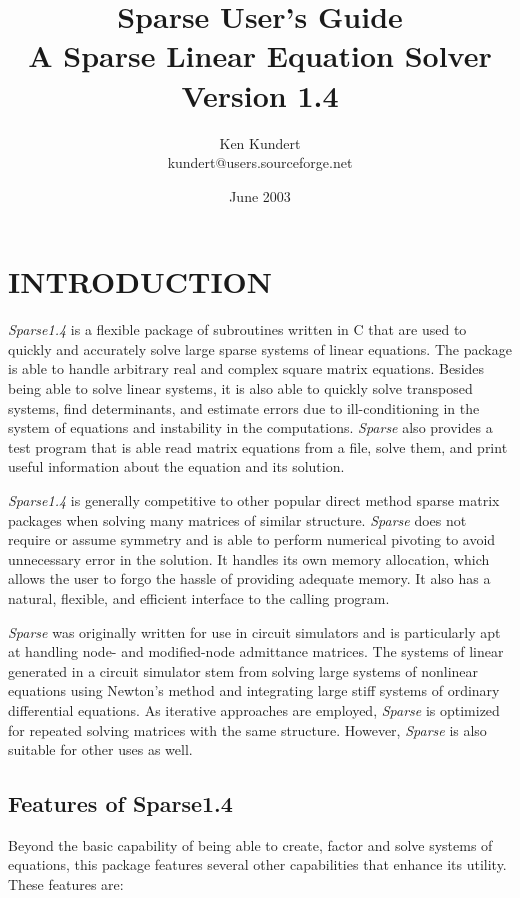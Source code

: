 \documentclass[11pt]{article}
\newcommand{\thetitle}{Sparse User's Guide}
\begin{document}
\title{
    \sffamily\bfseries\huge
    \thetitle \\
    \LARGE
    A Sparse Linear Equation Solver \\
    \large
    Version 1.4
}
\author{
    \sffamily Ken Kundert \\
    \sffamily kundert@users.sourceforge.net
}
\date{June 2003}
\maketitle

\sloppy


\section{INTRODUCTION}
\emph{Sparse1.4} is a flexible package of subroutines written in C
that are used
to quickly and accurately solve large sparse systems of linear
equations.  The package is able to handle arbitrary real and complex
square matrix equations.  Besides being able to solve linear systems,
it is also able to quickly solve transposed systems, find determinants,
and estimate errors due to ill-conditioning in the system of equations
and instability in the computations.  \emph{Sparse} also provides a test
program that is able read matrix equations from a file, solve them, and
print useful information about the equation and its solution.

\emph{Sparse1.4} is generally competitive to other popular
direct method sparse matrix packages when solving many matrices of similar
structure.  \emph{Sparse} does not require or assume symmetry and is
able to perform numerical pivoting to avoid unnecessary error in the
solution.  It handles its own memory allocation, which allows the user
to forgo the hassle of providing adequate memory.  It also has a
natural, flexible, and efficient interface to the calling program.

\emph{Sparse} was originally written for use in circuit simulators and
is particularly apt at handling node- and modified-node admittance
matrices.  The systems of linear generated in a circuit simulator stem
from solving large systems of nonlinear equations using Newton's method
and integrating large stiff systems of ordinary differential
equations.  As iterative approaches are employed, \emph{Sparse} is optimized
for repeated solving matrices with the same structure. However, \emph{Sparse}
is also suitable for other uses as well.

\subsection{Features of Sparse1.4}
Beyond the basic capability of being able to create, factor and 
solve systems of equations, this package features several other capabilities
that enhance its utility.  These features are:
\end{document}
